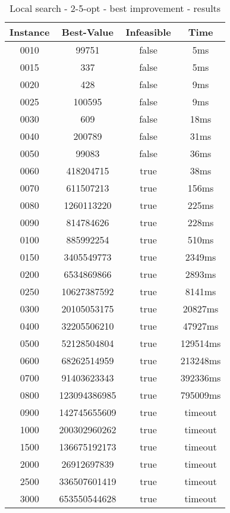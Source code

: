 




\begin{table}[H]
	\centering
	\begin{tabular}{|| c | c | c | c ||} 
		\hline
		Instance & Best-Value & Infeasible & Time \\
		\hline\hline
		0010 & 99751 & false & 5ms \\
		0015 & 337 & false & 5ms \\
		0020 & 428 & false & 9ms \\
		0025 & 100595 & false & 9ms \\
		0030 & 609 & false & 18ms \\
		0040 & 200789 & false & 31ms \\
		0050 & 99083 & false & 36ms \\
		0060 & 418204715 & true & 38ms \\
		0070 & 611507213 & true & 156ms \\
		0080 & 1260113220 & true & 225ms \\
		0090 & 814784626 & true & 228ms \\
		0100 & 885992254 & true & 510ms \\
		0150 & 3405549773 & true & 2349ms \\
		0200 & 6534869866 & true & 2893ms \\
		0250 & 10627387592 & true & 8141ms \\
		0300 & 20105053175 & true & 20827ms \\
		0400 & 32205506210 & true & 47927ms \\
		0500 & 52128504804 & true & 129514ms \\
		0600 & 68262514959 & true & 213248ms \\
		0700 & 91403623343 & true & 392336ms \\
		0800 & 123094386985 & true & 795009ms \\
		0900 & 142745655609 & true & timeout \\
		1000 & 200302960262 & true & timeout \\
		1500 & 136675192173 & true & timeout \\
		2000 & 26912697839 & true & timeout \\
		2500 & 336507601419 & true & timeout \\
		3000 & 653550544628 & true & timeout \\
		\hline
	\end{tabular}
	\caption{Local search - 2-5-opt - best improvement - results}
\end{table}

